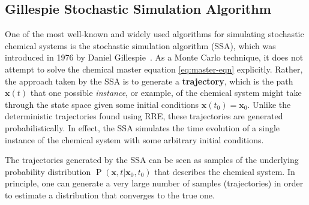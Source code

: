 \documentclass[english,letterpaper,12pt]{article}
\newcommand{\defkeywd}[1]{\textbf{#1}}
\renewcommand{\vec}[1]{\ensuremath{\mathbf{#1}}}
\DeclareMathOperator{\Prob}{P}
\begin{document}
\begin{doublespacing}
\subsection{Gillespie Stochastic Simulation Algorithm} %
\label{sub:gillespie-ssa}

One of the most well-known and widely used  algorithms for simulating stochastic chemical systems is the stochastic simulation algorithm (SSA), which was introduced in 1976 by Daniel Gillespie~\cite{gillespie-1976}. As a Monte Carlo technique, it does not attempt to solve the chemical master equation \eqref{eq:master-eqn} explicitly. Rather, the approach taken by the SSA is to generate a \defkeywd{trajectory}, which is the path $\vec{x}(t)$ that one possible \emph{instance}, or example, of the chemical system might take through the state space given some initial conditions $\vec{x}(t_0) = \vec{x}_0$. Unlike the deterministic trajectories found using RRE, these trajectories are generated probabilistically. In effect, the SSA simulates the time evolution of a single instance of the chemical system with some arbitrary initial conditions.

The trajectories generated by the SSA can be seen as samples of the underlying probability distribution $\Prob(\vec{x}, t | \vec{x}_0, t_0)$ that describes the chemical system. In principle, one can generate a very large number of samples (trajectories) in order to estimate a distribution that converges to the true one.


\end{doublespacing}
\end{document}
